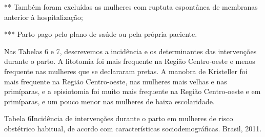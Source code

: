 \documentclass{article}
\begin{document}
** Também foram excluídas as mulheres com ruptuta espontânea de
membranas anterior à hospitalização;

*** Parto pago pelo plano de saúde ou pela própria paciente.

Nas Tabelas 6 e 7, descrevemos a incidência e os determinantes das intervenções
durante o parto. A litotomia foi mais frequente na Região Centro-oeste e menos
frequente nas mulheres que se declararam pretas. A manobra de Kristeller foi
mais
frequente na Região Centro-oeste, nas mulheres mais velhas e nas primíparas, e a
episiotomia foi muito mais frequente na Região Centro-oeste e em primíparas, e
um
pouco menor nas mulheres de baixa escolaridade.

Tabela 6Incidência de intervenções durante o parto em mulheres de risco
obstétrico habitual, de acordo com características sociodemográficas.
Brasil, 2011.










\end{document}
